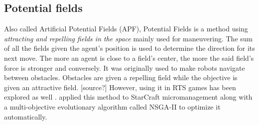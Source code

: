 \subsection{Potential fields}\label{subsec:potential-fields}

Also called Artificial Potential Fields (APF), Potential Fields is a method
using \emph{attracting and repelling fields in the space} mainly used for maneuvering.
The sum of all the fields given the agent's position is used to determine the
direction for its next move. The more an agent is close to a field's center,
the more the said field's force is stronger and conversely.
It was originally used to make robots navigate between obstacles. Obstacles are
given a repelling field while the objective is given an attractive field. [source?]
However, using it in RTS games has been explored as well \cite{HaJo08}.
\citet{BoAu12} applied this method to StarCraft micromanagement along with
a multi-objective evolutionary algorithm called NSGA-II to optimize it automatically.

